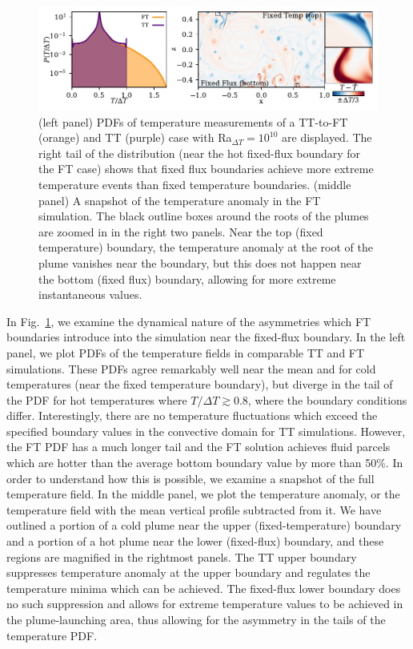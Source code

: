 \documentclass[aps, pre, onecolumn, nofootinbib, notitlepage, groupedaddress, amsfonts, amssymb, amsmath, longbibliography, superscriptaddress]{revtex4-1}
\begin{document}
\begin{figure}
\includegraphics[width=\textwidth]{./figs/rbc_dynamics_asymmetries.pdf}
\caption{ 
	(left panel) PDFs of temperature measurements of a TT-to-FT (orange) and TT (purple) case with Ra$_{\Delta T} = 10^{10}$ are displayed.
	The right tail of the distribution (near the hot fixed-flux boundary for the FT case) shows that fixed flux boundaries achieve more extreme temperature events than fixed temperature boundaries.
	(middle panel) A snapshot of the temperature anomaly in the FT simulation.
	The black outline boxes around the roots of the plumes are zoomed in in the right two panels.
	Near the top (fixed temperature) boundary, the temperature anomaly at the root of the plume vanishes near the boundary, but this does not happen near the bottom (fixed flux) boundary, allowing for more extreme instantaneous values.
\label{fig:rbc_dynamics_asymmetries} }
\end{figure}

In Fig.~\ref{fig:rbc_dynamics_asymmetries}, we examine the dynamical nature of the asymmetries which FT boundaries introduce into the simulation near the fixed-flux boundary.
In the left panel, we plot PDFs of the temperature fields in comparable TT and FT simulations.
These PDFs agree remarkably well near the mean and for cold temperatures (near the fixed temperature boundary), but diverge in the tail of the PDF for hot temperatures where $T/\Delta T \gtrsim 0.8$, where the boundary conditions differ.
Interestingly, there are no temperature fluctuations which exceed the specified boundary values in the convective domain for TT simulations.
However, the FT PDF has a much longer tail and the FT solution achieves fluid parcels which are hotter than the average bottom boundary value by more than 50\%.
In order to understand how this is possible, we examine a snapshot of the full temperature field.
In the middle panel, we plot the temperature anomaly, or the temperature field with the mean vertical profile subtracted from it.
We have outlined a portion of a cold plume near the upper (fixed-temperature) boundary and a portion of a hot plume near the lower (fixed-flux) boundary, and these regions are magnified in the rightmost panels.
The TT upper boundary suppresses temperature anomaly at the upper boundary and regulates the temperature minima which can be achieved.
The fixed-flux lower boundary does no such suppression and allows for extreme temperature values to be achieved in the plume-launching area, thus allowing for the asymmetry in the tails of the temperature PDF.
\end{document}
